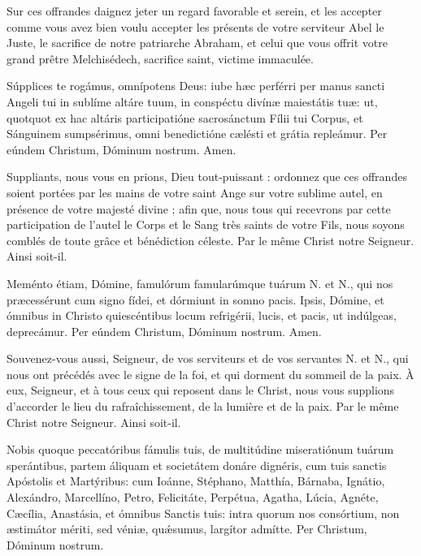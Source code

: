 \documentclass[twoside]{article}
\begin{document}
\begin{paracol}{2}
\switchcolumn

Sur ces offrandes daignez jeter un regard favorable et serein, et les accepter comme vous avez bien voulu accepter les présents de votre serviteur Abel le Juste, le sacriﬁce de notre patriarche Abraham, et celui que vous offrit votre grand prêtre Melchisédech, sacriﬁce saint, victime immaculée.

\switchcolumn*

Súpplices te rogámus, omnípotens Deus: iube hæc perférri per manus sancti Angeli tui in sublíme altáre tuum, in conspéctu divínæ maiestátis tuæ: ut, quotquot ex hac altáris participatióne sacrosánctum Fílii tui Cor\cc pus, et Sán\cc guinem sumpsérimus, omni benedictióne cælésti et grátia repleámur. Per eúndem Christum, Dóminum nostrum. Amen.

\switchcolumn

Suppliants, nous vous en prions, Dieu tout-puissant : ordonnez que ces offrandes soient portées par les mains de votre saint Ange sur votre sublime autel, en présence de votre majesté divine ; aﬁn que, nous tous qui recevrons par cette participation de l’autel le Corps et le Sang très saints de votre Fils, nous soyons comblés de toute grâce et bénédiction céleste. Par le même Christ notre Seigneur. Ainsi soit-il.

\switchcolumn*

Meménto étiam, Dómine, famulórum famularúmque tuárum N. et N., qui nos præcessérunt cum signo fídei, et dórmiunt in somno pacis. Ipsis, Dómine, et ómnibus in Christo quiescéntibus locum refrigérii, lucis, et pacis, ut indúlgeas, deprecámur. Per eúndem Christum, Dóminum nostrum. Amen.

\switchcolumn

Souvenez-vous aussi, Seigneur, de vos serviteurs et de vos servantes N. et N., qui nous ont précédés avec le signe de la foi, et qui dorment du sommeil de la paix. À eux, Seigneur, et à tous ceux qui reposent dans le Christ, nous vous supplions d’accorder le lieu du rafraîchissement, de la lumière et de la paix. Par le même Christ notre Seigneur. Ainsi soit-il.

\switchcolumn*

Nobis quoque peccatóribus fámulis tuis, de multitúdine miseratiónum tuárum sperántibus, partem áliquam et societátem donáre dignéris, cum tuis sanctis Apóstolis et Martýribus: cum Ioánne, Stéphano, Matthía, Bárnaba, Ignátio, Alexándro, Marcellíno, Petro, Felicitáte, Perpétua, Agatha, Lúcia, Agnéte, Cæcília, Anastásia, et ómnibus Sanctis tuis: intra quorum nos consórtium, non æstimátor mériti, sed véniæ, quǽsumus, largítor admítte. Per Christum, Dóminum nostrum.


\end{paracol}
\end{document}
